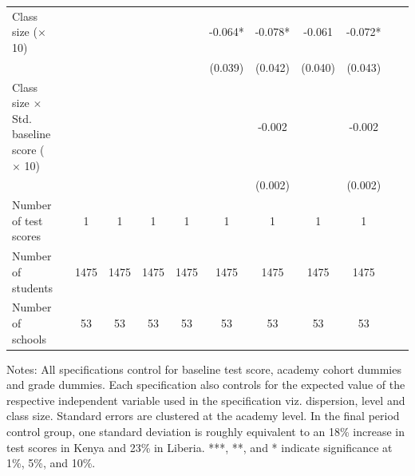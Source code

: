 \begin{center}
\begin{scriptsize}
\begin{threeparttable}
\begin{tabular} {@{} l l c c c c c c c c c c  @{}}
Class size ($\times$ 10) &  &  &  &  &  & -0.064* & -0.078* & -0.061 & -0.072* \\
                 &  &  &  &  &  & (0.039) & (0.042) & (0.040) & (0.043) \\
Class size $\times$ Std. baseline score ($\times$ 10) &  &  &  &  &  &  & -0.002 &  & -0.002 \\
                 &  &  &  &  &  &  & (0.002) &  & (0.002) \\
\midrule
Number of test scores &  & 1 & 1 & 1 & 1 & 1 & 1 & 1 & 1 \\
Number of students &  & 1475 & 1475 & 1475 & 1475 & 1475 & 1475 & 1475 & 1475 \\
Number of schools &  & 53 & 53 & 53 & 53 & 53 & 53 & 53 & 53 \\
\bottomrule
\end{tabular}
\begin{tablenotes}
\item Notes: All specifications control for baseline test score, academy cohort dummies and grade dummies. Each specification also controls for the expected value of the respective independent variable used in the specification viz. dispersion, level and class size. Standard errors are clustered at the academy level. In the final period control group, one standard deviation is roughly equivalent to an 18\% increase in test scores in Kenya and 23\% in Liberia. ***, **, and * indicate significance at 1\%, 5\%, and 10\%.\end{tablenotes}
\end{threeparttable}
\end{scriptsize}
\end{center}
\clearpage
